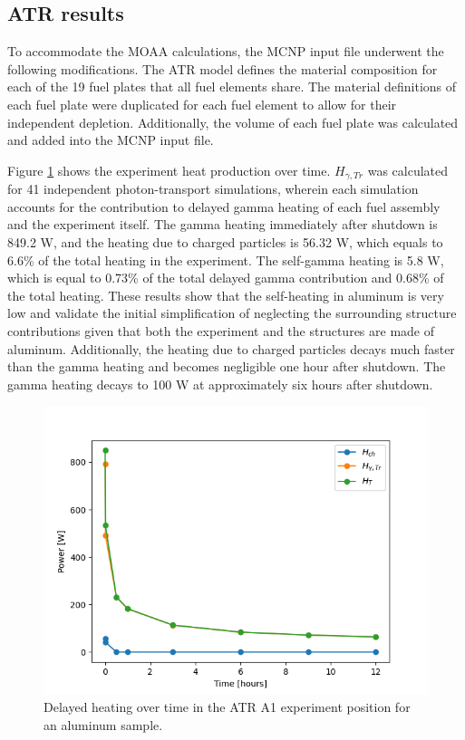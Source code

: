 \subsection{ATR results}

To accommodate the MOAA calculations, the MCNP input file underwent the following modifications.
The ATR model defines the material composition for each of the 19 fuel plates that all fuel elements share.
The material definitions of each fuel plate were duplicated for each fuel element to allow for their independent depletion.
Additionally, the volume of each fuel plate was calculated and added into the MCNP input file.

Figure \ref{fig:atr-time} shows the experiment heat production over time.
$H_{\gamma,Tr}$ was calculated for 41 independent photon-transport simulations, wherein each simulation accounts for the contribution to delayed gamma heating of each fuel assembly and the experiment itself.
The gamma heating immediately after shutdown is 849.2 W, and the heating due to charged particles is 56.32 W, which equals to 6.6\% of the total heating in the experiment.
The self-gamma heating is 5.8 W, which is equal to 0.73\% of the total delayed gamma contribution and 0.68\% of the total heating.
These results show that the self-heating in aluminum is very low and validate the initial simplification of neglecting the surrounding structure contributions given that both the experiment and the structures are made of aluminum.
Additionally, the heating due to charged particles decays much faster than the gamma heating and becomes negligible one hour after shutdown.
The gamma heating decays to 100 W at approximately six hours after shutdown.

\begin{figure}[htbp!] %
    \centering
    \includegraphics[width=0.65\linewidth]{figures/atr-decay-heat-time}
    \hfill
    \caption{Delayed heating over time in the ATR A1 experiment position for an aluminum sample.}
    \label{fig:atr-time}
\end{figure}


